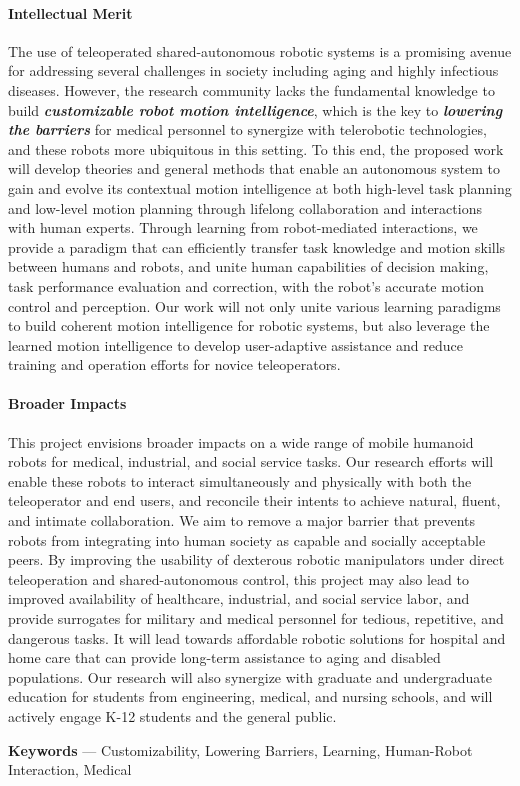 \paragraph*{\Large Intellectual Merit}
The use of teleoperated shared-autonomous robotic systems is a promising avenue for addressing several challenges in society including aging and highly infectious diseases. However, the research community lacks the fundamental knowledge to build \textit{\textbf{customizable robot motion intelligence}}, which is the key to \textit{\textbf{lowering the barriers}} for medical personnel to synergize with telerobotic technologies, and these robots more ubiquitous in this setting. To this end, the proposed work will develop theories and general methods that enable an autonomous system to gain and evolve its contextual motion intelligence at both high-level task planning and low-level motion planning through lifelong collaboration and interactions with human experts. Through learning from robot-mediated interactions, we provide a paradigm that can efficiently transfer task knowledge and motion skills between humans and robots, and unite human capabilities of decision making, task performance evaluation and correction, with the robot's accurate motion control and perception.
Our work will not only unite various learning paradigms to build coherent motion intelligence for robotic systems, but also leverage the learned motion intelligence to develop user-adaptive assistance and reduce training and operation efforts for novice teleoperators. 

\vspace{0.5 em}

\paragraph*{\Large Broader Impacts}
This project envisions broader impacts on a wide range of mobile humanoid robots for medical, industrial, and social service tasks. Our research efforts will enable these robots to interact simultaneously and physically with both the teleoperator and end users, and reconcile their intents to achieve natural, fluent, and intimate collaboration.
We aim to remove a major barrier that prevents robots from integrating into human society as capable and socially acceptable peers. By improving the usability of dexterous robotic manipulators under direct teleoperation and shared-autonomous control, this project may also lead to improved availability of healthcare, industrial, and social service labor, and provide surrogates for military and medical personnel for tedious, repetitive, and dangerous tasks. It will lead towards affordable robotic solutions for hospital and home care that can provide long-term assistance to aging and disabled populations. Our research will also synergize with graduate and undergraduate education for students from engineering, medical, and nursing schools, and will actively engage K-12 students and the general public. 

\vspace{2 em}
\noindent
\textbf{Keywords} --- Customizability, Lowering Barriers, Learning, Human-Robot Interaction, Medical